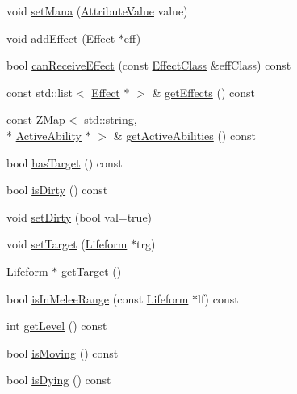 \begin{DoxyCompactItemize}
void \hyperlink{classZeta_1_1Lifeform_a5065071f5d7261813aef8a9690f42532}{set\+Mana} (\hyperlink{namespaceZeta_ab5947f98c0ab6302b51f8c6e93ec5581}{Attribute\+Value} value)
\item 
void \hyperlink{classZeta_1_1Lifeform_a4ee61365e2049b0bea2df0081d13303a}{add\+Effect} (\hyperlink{classZeta_1_1Effect}{Effect} $\ast$eff)
\item 
bool \hyperlink{classZeta_1_1Lifeform_a24057f38e07bbad1247b4325b1b1e400}{can\+Receive\+Effect} (const \hyperlink{classZeta_1_1EffectClass}{Effect\+Class} \&eff\+Class) const 
\item 
const std\+::list$<$ \hyperlink{classZeta_1_1Effect}{Effect} $\ast$ $>$ \& \hyperlink{classZeta_1_1Lifeform_a46b4126b1e7147bcfa1bbfab5a8e99ca}{get\+Effects} () const 
\item 
const \hyperlink{namespaceZeta_a9af2e12c4e432d2a1725f19e5a648a04}{Z\+Map}$<$ std\+::string, \\*
\hyperlink{classZeta_1_1ActiveAbility}{Active\+Ability} $\ast$ $>$ \& \hyperlink{classZeta_1_1Lifeform_aef63acecb213176b223e90686704b05e}{get\+Active\+Abilities} () const 
\item 
bool \hyperlink{classZeta_1_1Lifeform_adc5bad00964ab3d8ab7e566dc6aa8bbc}{has\+Target} () const 
\item 
bool \hyperlink{classZeta_1_1Lifeform_aa7c8f7d38ea6bf25bd2262ddf3a17d51}{is\+Dirty} () const 
\item 
void \hyperlink{classZeta_1_1Lifeform_a55d8fd5248ea953dd1c6174d996dadef}{set\+Dirty} (bool val=true)
\item 
void \hyperlink{classZeta_1_1Lifeform_a033669caa15e809b0516221582da61ee}{set\+Target} (\hyperlink{classZeta_1_1Lifeform}{Lifeform} $\ast$trg)
\item 
\hyperlink{classZeta_1_1Lifeform}{Lifeform} $\ast$ \hyperlink{classZeta_1_1Lifeform_ab6362abf8443b77e940e476aadc081fc}{get\+Target} ()
\item 
bool \hyperlink{classZeta_1_1Lifeform_a221d61b6395fe4b0d7651ddb5c190592}{is\+In\+Melee\+Range} (const \hyperlink{classZeta_1_1Lifeform}{Lifeform} $\ast$lf) const 
\item 
int \hyperlink{classZeta_1_1Lifeform_ae9e6af8277747693478f6173397bbaff}{get\+Level} () const 
\item 
bool \hyperlink{classZeta_1_1Lifeform_a9681e69a16716578965f6e42ce818c60}{is\+Moving} () const 
\item 
bool \hyperlink{classZeta_1_1Lifeform_a298b7b46098b376c8271770ee5b212e4}{is\+Dying} () const 
\item 

\end{DoxyCompactItemize}
